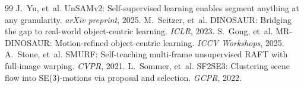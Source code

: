 \documentclass[10pt,twocolumn,letterpaper]{article}
\begin{document}
\begin{thebibliography}{99}
 J.~Yu, et~al. UnSAMv2: Self-supervised learning enables segment anything at any granularity. \emph{arXiv preprint}, 2025.
 M.~Seitzer, et~al. DINOSAUR: Bridging the gap to real-world object-centric learning. \emph{ICLR}, 2023.
 S.~Gong, et~al. MR-DINOSAUR: Motion-refined object-centric learning. \emph{ICCV Workshops}, 2025.
 A.~Stone, et~al. SMURF: Self-teaching multi-frame unsupervised RAFT with full-image warping. \emph{CVPR}, 2021.
 L.~Sommer, et~al. SF2SE3: Clustering scene flow into SE(3)-motions via proposal and selection. \emph{GCPR}, 2022.
\end{thebibliography}
\end{document}
